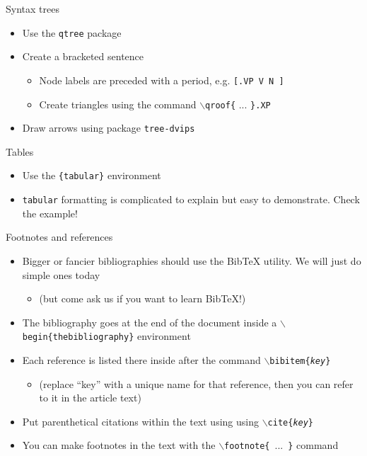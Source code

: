 \documentclass{beamer}
\begin{document}
\begin{frame}{Syntax trees}
	\begin{itemize}
	\pause
	\item Use the \texttt{qtree} package
	\pause
	\item Create a bracketed sentence
		\begin{itemize}
		\item Node labels are preceded with a period, e.g. \texttt{[.VP  V  N  ]}
		\item Create triangles using the command \texttt{$\backslash$qroof\{} ... \texttt{\}.XP}
		\end{itemize}
	\pause
	\item Draw arrows using package \texttt{tree-dvips}
	\end{itemize}
\end{frame}


\begin{frame}{Tables}
	\begin{itemize}
	\pause
	\item Use the \texttt{\{tabular\}} environment
	\pause
	\item \texttt{tabular} formatting is complicated to explain but easy to demonstrate. Check the example!
	\end{itemize}
\end{frame}

\begin{frame}{Footnotes and references}
	\begin{itemize}
	\pause
	\item Bigger or fancier bibliographies should use the BibTeX utility. We will just do simple ones today
		\begin{itemize}
		\item (but come ask us if you want to learn BibTeX!)
		\end{itemize}
	\pause
	\item The bibliography goes at the end of the document inside a \texttt{$\backslash$begin\{thebibliography\}} environment
	\pause
	\item Each reference is listed there inside after the command \texttt{$\backslash$bibitem\{\textit{key}\}}
		\begin{itemize}
		\item (replace ``key'' with a unique name for that reference, then you can refer to it in the article text)
		\end{itemize}
	\pause
	\item Put parenthetical citations within the text using using \texttt{$\backslash$cite\{\textit{key}\}}
	\pause
	\item You can make footnotes in the text with the \mbox{\texttt{$\backslash$footnote\{} ... \texttt{\}}} command
	\end{itemize}
\end{frame}
\end{document}
